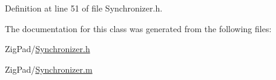 Definition at line 51 of file Synchronizer.h.



The documentation for this class was generated from the following files:\begin{DoxyCompactItemize}
\item 
ZigPad/\hyperlink{_synchronizer_8h}{Synchronizer.h}\item 
ZigPad/\hyperlink{_synchronizer_8m}{Synchronizer.m}\end{DoxyCompactItemize}
